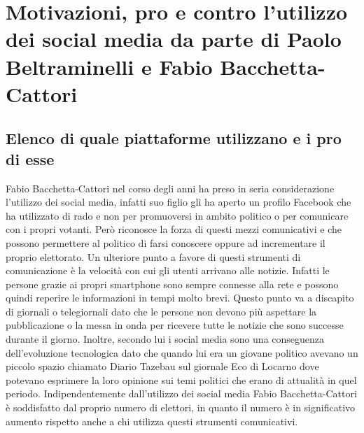 \section{Motivazioni, pro e contro l’utilizzo dei social media da parte di Paolo Beltraminelli e Fabio Bacchetta-Cattori}
\subsection{Elenco di quale piattaforme utilizzano e i pro di esse}
Fabio Bacchetta-Cattori nel corso degli anni ha preso in seria considerazione l’utilizzo dei social media, infatti suo figlio gli ha aperto un profilo Facebook che ha utilizzato di rado e non per promuoversi in ambito politico o per comunicare con i propri votanti. Però riconosce la forza di questi mezzi comunicativi e che possono permettere al politico di farsi conoscere oppure ad incrementare il proprio elettorato. Un ulteriore punto a favore di questi strumenti di comunicazione è la velocità con cui gli utenti arrivano alle notizie. Infatti le persone grazie ai propri smartphone sono sempre connesse alla rete e possono quindi reperire le informazioni in tempi molto brevi. Questo punto va a discapito di giornali o telegiornali dato che le persone non devono più aspettare la pubblicazione o la messa in onda per ricevere tutte le notizie che sono successe durante il giorno. Inoltre, secondo lui i social media sono una conseguenza dell’evoluzione tecnologica dato che quando lui era un giovane politico avevano un piccolo spazio chiamato Diario Tazebau sul giornale Eco di Locarno dove potevano esprimere la loro opinione sui temi politici che erano di attualità in quel periodo. Indipendentemente dall’utilizzo dei social media Fabio Bacchetta-Cattori è soddisfatto dal proprio numero di elettori, in quanto il numero è in significativo aumento rispetto anche a chi utilizza questi strumenti comunicativi.
